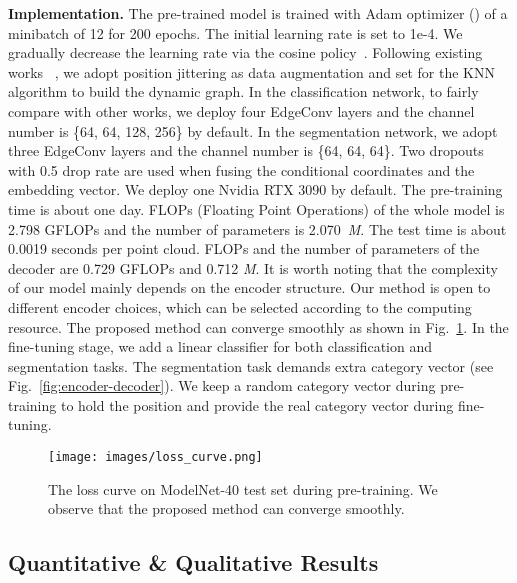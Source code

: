 \documentclass[journal]{IEEEtran}
\begin{document}
\textbf{Implementation.} The pre-trained model is trained with Adam optimizer () of a minibatch of 12 for 200 epochs. The initial learning rate is set to 1e-4. We gradually decrease the learning rate via the cosine policy~\cite{2016SGDR}. Following existing works ~\cite{wang2019dynamic, zheng2020parameter}, we adopt position jittering as data augmentation and set  for the KNN algorithm to build the dynamic graph. 
In the classification network, to fairly compare with other works, we deploy four EdgeConv layers and the channel number is \{64, 64, 128, 256\} by default. In the segmentation network, we adopt three EdgeConv layers and the channel number is \{64, 64, 64\}. Two dropouts with 0.5 drop rate are used when fusing the conditional coordinates and the embedding vector. We deploy one Nvidia RTX 3090 by default. The pre-training time is about one day. FLOPs (Floating Point Operations) of the whole model is 2.798 GFLOPs and the number of parameters is 2.070~\emph{M}. The test time is about 0.0019 seconds per point cloud. FLOPs and the number of parameters of the decoder are 0.729 GFLOPs and 0.712 \emph{M}. It is worth noting that the complexity of our model mainly depends on the encoder structure. Our method is open to different encoder choices, which can be selected according to the computing resource. 
The proposed method can converge smoothly as shown in Fig.~\ref{fig:loss_curve}. In the fine-tuning stage, we add a linear classifier for both classification and segmentation tasks. The segmentation task demands extra category vector (see Fig.~\ref{fig:encoder-decoder}). We keep a random category vector during pre-training to hold the position and provide the real category vector during fine-tuning.



\begin{figure}[t]
\begin{center}
\texttt{[image: images/loss\_curve.png]}
\end{center}
\vspace{-.15in}
   \caption{The loss curve on ModelNet-40 test set during pre-training. We observe that the proposed method can converge smoothly.}
\label{fig:loss_curve}
\end{figure}




\subsection{Quantitative \& Qualitative Results}
\end{document}
